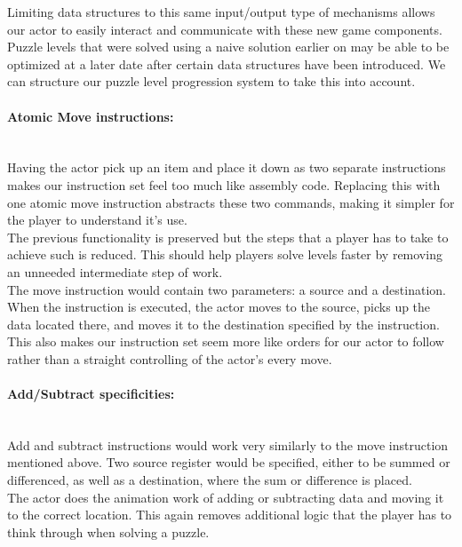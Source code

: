 Limiting data structures to this same input/output type of mechanisms allows our
actor to easily interact and communicate with these new game components.\\

Puzzle levels that were solved using a naive solution earlier on may be able to be
optimized at a later date after certain data structures have been introduced. We can
structure our puzzle level progression system to take this into account.\\

\paragraph{Atomic Move instructions:} ~\\
Having the actor pick up an item and place it down as two separate instructions
makes our instruction set feel too much like assembly code. Replacing this with one
atomic move instruction abstracts these two commands, making it simpler for the player
to understand it's use.\\

The previous functionality is preserved but the steps that a player has to take to achieve
such is reduced. This should help players solve levels faster by removing an unneeded
intermediate step of work.\\

The move instruction would contain two parameters: a source and a destination. When the
instruction is executed, the actor moves to the source, picks up the data located there, and moves
it to the destination specified by the instruction. This also makes our instruction set seem
more like orders for our actor to follow rather than a straight controlling of the actor's
every move.\\

\paragraph{Add/Subtract specificities:} ~\\
Add and subtract instructions would work very similarly to the move instruction
mentioned above. Two source register would be specified, either to be summed or differenced,
as well as a destination, where the sum or difference is placed.\\

The actor does the animation work of adding or subtracting data and moving it to the correct
location. This again removes additional logic that the player has to think through when
solving a puzzle.\\

